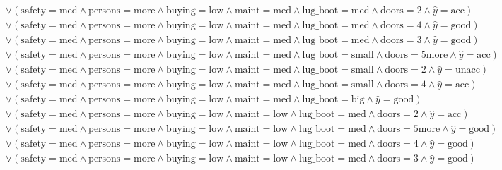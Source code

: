 \begin{scriptsize}
\[\begin{aligned}
  \\ & \lor (\text{safety}=\text{med} \land \text{persons}=\text{more} \land \text{buying}=\text{low} \land \text{maint}=\text{med} \land \text{lug_boot}=\text{med} \land \text{doors}=\text{2} \land \hat{y}=\text{acc})
  \\ & \lor (\text{safety}=\text{med} \land \text{persons}=\text{more} \land \text{buying}=\text{low} \land \text{maint}=\text{med} \land \text{lug_boot}=\text{med} \land \text{doors}=\text{4} \land \hat{y}=\text{good})
  \\ & \lor (\text{safety}=\text{med} \land \text{persons}=\text{more} \land \text{buying}=\text{low} \land \text{maint}=\text{med} \land \text{lug_boot}=\text{med} \land \text{doors}=\text{3} \land \hat{y}=\text{good})
  \\ & \lor (\text{safety}=\text{med} \land \text{persons}=\text{more} \land \text{buying}=\text{low} \land \text{maint}=\text{med} \land \text{lug_boot}=\text{small} \land \text{doors}=\text{5more} \land \hat{y}=\text{acc})
  \\ & \lor (\text{safety}=\text{med} \land \text{persons}=\text{more} \land \text{buying}=\text{low} \land \text{maint}=\text{med} \land \text{lug_boot}=\text{small} \land \text{doors}=\text{2} \land \hat{y}=\text{unacc})
  \\ & \lor (\text{safety}=\text{med} \land \text{persons}=\text{more} \land \text{buying}=\text{low} \land \text{maint}=\text{med} \land \text{lug_boot}=\text{small} \land \text{doors}=\text{4} \land \hat{y}=\text{acc})
  \\ & \lor (\text{safety}=\text{med} \land \text{persons}=\text{more} \land \text{buying}=\text{low} \land \text{maint}=\text{med} \land \text{lug_boot}=\text{big} \land \hat{y}=\text{good})
  \\ & \lor (\text{safety}=\text{med} \land \text{persons}=\text{more} \land \text{buying}=\text{low} \land \text{maint}=\text{low} \land \text{lug_boot}=\text{med} \land \text{doors}=\text{2} \land \hat{y}=\text{acc})
  \\ & \lor (\text{safety}=\text{med} \land \text{persons}=\text{more} \land \text{buying}=\text{low} \land \text{maint}=\text{low} \land \text{lug_boot}=\text{med} \land \text{doors}=\text{5more} \land \hat{y}=\text{good})
  \\ & \lor (\text{safety}=\text{med} \land \text{persons}=\text{more} \land \text{buying}=\text{low} \land \text{maint}=\text{low} \land \text{lug_boot}=\text{med} \land \text{doors}=\text{4} \land \hat{y}=\text{good})
  \\ & \lor (\text{safety}=\text{med} \land \text{persons}=\text{more} \land \text{buying}=\text{low} \land \text{maint}=\text{low} \land \text{lug_boot}=\text{med} \land \text{doors}=\text{3} \land \hat{y}=\text{good})

\end{aligned}\]
\end{scriptsize}
